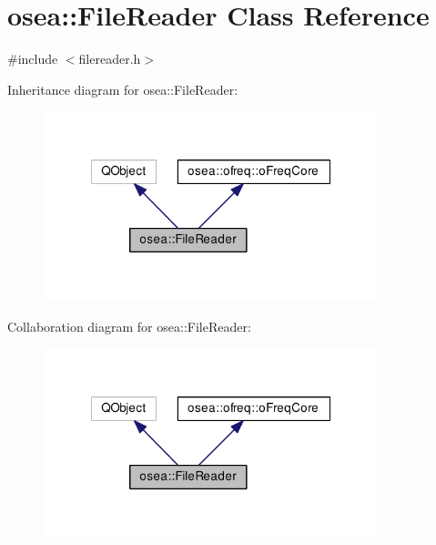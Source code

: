 \hypertarget{classosea_1_1_file_reader}{\section{osea\-:\-:File\-Reader Class Reference}
\label{classosea_1_1_file_reader}
}


{\ttfamily \#include $<$filereader.\-h$>$}



Inheritance diagram for osea\-:\-:File\-Reader\-:\nopagebreak
\begin{figure}[H]
\begin{center}
\leavevmode
\includegraphics[width=275pt]{classosea_1_1_file_reader__inherit__graph}
\end{center}
\end{figure}


Collaboration diagram for osea\-:\-:File\-Reader\-:\nopagebreak
\begin{figure}[H]
\begin{center}
\leavevmode
\includegraphics[width=275pt]{classosea_1_1_file_reader__coll__graph}
\end{center}
\end{figure}
